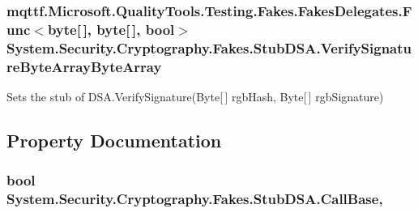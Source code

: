 \hypertarget{class_system_1_1_security_1_1_cryptography_1_1_fakes_1_1_stub_d_s_a_acf7c97d2a4a26394ae02415aeff84688}{
\subsubsection[{Verify\-Signature\-Byte\-Array\-Byte\-Array}]{\setlength{\rightskip}{0pt plus 5cm}mqttf.\-Microsoft.\-Quality\-Tools.\-Testing.\-Fakes.\-Fakes\-Delegates.\-Func$<$byte\mbox{[}$\,$\mbox{]}, byte\mbox{[}$\,$\mbox{]}, bool$>$ System.\-Security.\-Cryptography.\-Fakes.\-Stub\-D\-S\-A.\-Verify\-Signature\-Byte\-Array\-Byte\-Array}}\label{class_system_1_1_security_1_1_cryptography_1_1_fakes_1_1_stub_d_s_a_acf7c97d2a4a26394ae02415aeff84688}


Sets the stub of D\-S\-A.\-Verify\-Signature(\-Byte\mbox{[}$\,$\mbox{]} rgb\-Hash, Byte\mbox{[}$\,$\mbox{]} rgb\-Signature)



\subsection{Property Documentation}
\hypertarget{class_system_1_1_security_1_1_cryptography_1_1_fakes_1_1_stub_d_s_a_a8161dd6896d957e5d667efa7effbbaf8}{
\subsubsection[{Call\-Base}]{\setlength{\rightskip}{0pt plus 5cm}bool System.\-Security.\-Cryptography.\-Fakes.\-Stub\-D\-S\-A.\-Call\-Base\hspace{0.3cm}{\ttfamily [get]}, {\ttfamily [set]}}}\label{class_system_1_1_security_1_1_cryptography_1_1_fakes_1_1_stub_d_s_a_a8161dd6896d957e5d667efa7effbbaf8}


